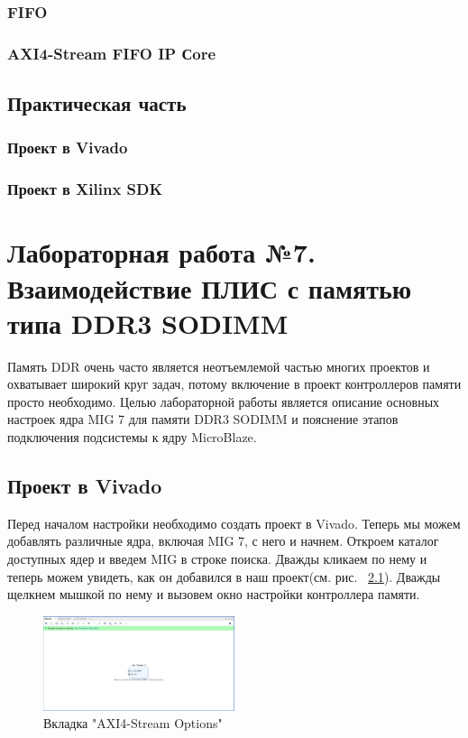 \documentclass[a4paper,oneside ,14pt]{extreport}
\begin{document}
\subsection{FIFO}

\subsection{AXI4-Stream FIFO IP Сore}

\section{Практическая часть}

\subsection{Проект в Vivado}

\subsection{Проект в Xilinx SDK}

\chapter{Лабораторная работа №7. Взаимодействие ПЛИС с памятью типа DDR3 SODIMM}

Память DDR очень часто является неотъемлемой частью многих проектов и охватывает широкий круг задач, потому включение в проект контроллеров памяти просто необходимо.
Целью лабораторной работы является описание основных настроек ядра MIG 7 для памяти DDR3 SODIMM и пояснение этапов подключения подсистемы к ядру MicroBlaze.

\section{Проект в Vivado}

Перед началом настройки необходимо создать проект в Vivado. Теперь мы можем добавлять различные ядра, включая MIG 7, с него и начнем. Откроем каталог доступных ядер и введем MIG в строке поиска. Дважды кликаем по нему и теперь можем увидеть, как он добавился в наш проект(см. рис. ~\ref{mig_0_2}). Дважды щелкнем мышкой по нему и вызовем окно настройки контроллера памяти.

\begin{figure}[h]
	\centering
	\includegraphics[width=0.5\textwidth]{image/mig_0_2.png}
	\caption{Вкладка "AXI4-Stream Options"}
	\label{mig_0_2}
\end{figure}
\end{document}
